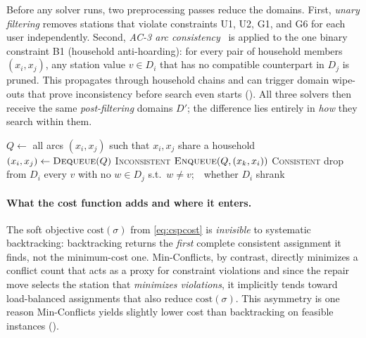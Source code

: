 \documentclass{ai-lab-report}
\begin{document}
Before any solver runs, two preprocessing passes reduce the domains. First, \emph{unary filtering} removes stations that violate constraints U1, U2, G1, and G6 for each user independently. Second, \emph{AC-3 arc consistency}~\citep{mackworth1977consistency} is applied to the one binary constraint B1 (household anti-hoarding): for every pair of household members $(x_i, x_j)$, any station value $v \in D_i$ that has no compatible counterpart in $D_j$ is pruned. This propagates through household chains and can trigger domain wipe-outs that prove inconsistency before search even starts (). All three solvers then receive the same \emph{post-filtering} domains $D'$; the difference lies entirely in \emph{how} they search within them.

\begin{algorithm}[H]
\caption{AC-3 arc consistency for the household not-equal constraint (B1).}
\label{alg:ac3}
\begin{algorithmic}[1]
\State $Q\gets$ all arcs $(x_i,x_j)$ such that $x_i,x_j$ share a household
  \State $(x_i,x_j)\gets\textsc{Dequeue}(Q)$
     \Return \textsc{Inconsistent}
    \EndIf
     \State $\textsc{Enqueue}(Q,(x_k,x_i))$
    \EndFor
  \EndIf
\EndWhile
\State \Return \textsc{Consistent}
\Statex
{}
  \State drop from $D_i$ every $v$ with no $w\in D_j$ s.t.\ $w\neq v$;\ \ \Return whether $D_i$ shrank
\EndFunction
\end{algorithmic}
\end{algorithm}


\paragraph{What the cost function adds and where it enters.}
The soft objective $\mathrm{cost}(\sigma)$ from \cref{eq:cspcost} is \emph{invisible} to systematic backtracking: backtracking returns the \emph{first} complete consistent assignment it finds, not the minimum-cost one. Min-Conflicts, by contrast, directly minimizes a conflict count that acts as a proxy for constraint violations and since the repair move selects the station that \emph{minimizes violations}, it implicitly tends toward load-balanced assignments that also reduce $\mathrm{cost}(\sigma)$. This asymmetry is one reason Min-Conflicts yields slightly lower cost than backtracking on feasible instances ().
\end{document}
